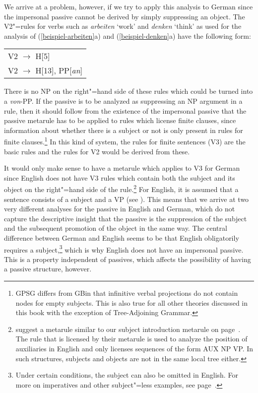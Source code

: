 We arrive at a problem, however, if we try to apply this analysis to German since the impersonal passive cannot be derived
by simply suppressing an object. The V2"=rules for verbs such as \emph{arbeiten} `work' and \emph{denken} `think' as used for the analysis of
(\ref{beispiel-arbeiten}a) and (\ref{beispiel-denken}a) have the following form:
\ea
\begin{tabular}[t]{@{}l@{}}
V2 $\to$ H[5]\\
V2 $\to$ H[13], PP[\emph{an}]\\
\end{tabular}
\z
There is no NP on the right"=hand side of these rules which could be turned into a \emph{von}-PP. If the passive
is to be analyzed as suppressing an NP argument in a rule, then it should follow from the existence of the impersonal passive 
that the passive metarule has to be applied to rules which license finite clauses, since information about whether there is a subject
 or not is only present in rules for finite clauses.\footnote{
	GPSG differs from GB\indexgb in that infinitive verbal projections do not contain nodes for empty subjects. This is also true for all other
	theories discussed in this book with the exception of Tree-Adjoining Grammar\indextag.
} In this kind of system, the rules for finite sentences (V3) are the basic rules and the rules for V2 would be derived from these.
 
It would only make sense to have a metarule which applies to V3 for German since English does not have V3 rules which contain both the subject
and its object on the right"=hand side of the rule.\footnote{
 \citet[]{GKPS85a} suggest a metarule similar to our subject introduction metarule on page~\pageref{subjekt-meta}.
 The rule that is licensed by their metarule is used to analyze the position of auxiliaries in English and only licenses sequences of the form AUX NP VP. In such structures,
 subjects and objects are not in the same local tree either.
}
For English, it is assumed that a sentence consists of a subject and a VP (see \citealp[]{GKPS85a}). 
This means that we arrive at two very different analyses for the passive in English and German, which do not capture
the descriptive insight that the passive is the suppression of the subject and the subsequent
promotion of the object in the same way.
The central difference
between German and English seems to be that English obligatorily requires a subject,\footnote{
  Under certain conditions, the subject can also be omitted in English. For more on imperatives and other subject"=less examples, see
  page~\pageref{Beispiel-Imperativ-Englisch}.
} which is why English does not have an impersonal passive. 
This is a property independent of passives, which affects the possibility of having a passive structure, however.

